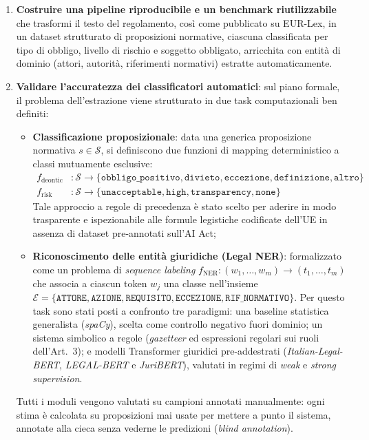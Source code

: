 \documentclass[12pt,a4paper,oneside]{report}
\begin{document}
\begin{enumerate}
\item \textbf{Costruire una pipeline riproducibile e un benchmark riutilizzabile} che trasformi il testo del regolamento, così come pubblicato su EUR-Lex, in un dataset strutturato di proposizioni normative, ciascuna classificata per tipo di obbligo, livello di rischio e soggetto obbligato, arricchita con entità di dominio (attori, autorità, riferimenti normativi) estratte automaticamente.

\item \textbf{Validare l'accuratezza dei classificatori automatici}: sul piano formale, il problema dell'estrazione viene strutturato in due task computazionali ben definiti:
\begin{itemize}
    \item \textbf{Classificazione proposizionale}: data una generica proposizione normativa $s \in \mathcal{S}$, si definiscono due funzioni di mapping deterministico a classi mutuamente esclusive:
    \begin{align*}
        f_{\text{deontic}} &: \mathcal{S} \to \{\texttt{obbligo\_positivo}, \texttt{divieto}, \texttt{eccezione}, \texttt{definizione}, \texttt{altro}\} \\
        f_{\text{risk}} &: \mathcal{S} \to \{\texttt{unacceptable}, \texttt{high}, \texttt{transparency}, \texttt{none}\}
    \end{align*}
    Tale approccio a regole di precedenza è stato scelto per aderire in modo trasparente e ispezionabile alle formule legistiche codificate dell'UE in assenza di dataset pre-annotati sull'AI Act;
    \item \textbf{Riconoscimento delle entità giuridiche (Legal NER)}: formalizzato come un problema di \emph{sequence labeling} $f_{\text{NER}}: (w_1, \dots, w_m) \to (t_1, \dots, t_m)$ che associa a ciascun token $w_j$ una classe nell'insieme $\mathcal{E} = \{\texttt{ATTORE}, \texttt{AZIONE}, \texttt{REQUISITO}, \texttt{ECCEZIONE}, \texttt{RIF\_NORMATIVO}\}$. Per questo task sono stati posti a confronto tre paradigmi: una baseline statistica generalista (\emph{spaCy}), scelta come controllo negativo fuori dominio; un sistema simbolico a regole (\emph{gazetteer} ed espressioni regolari sui ruoli dell'Art.~3); e modelli Transformer giuridici pre-addestrati (\emph{Italian-Legal-BERT}, \emph{LEGAL-BERT} e \emph{JuriBERT}), valutati in regimi di \emph{weak} e \emph{strong supervision}.
\end{itemize}
Tutti i moduli vengono valutati su campioni annotati manualmente: ogni stima è calcolata su proposizioni mai usate per mettere a punto il sistema, annotate alla cieca senza vederne le predizioni (\emph{blind annotation}).


\end{enumerate}
\end{document}
